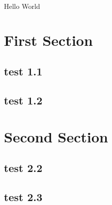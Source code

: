 \documentclass{article}
\begin{document}
Hello World

\section{First Section}

\subsection{test 1.1}


\subsection{test 1.2}

\section{Second Section}



\subsection{test 2.2}

\subsection{test 2.3}
\end{document}
